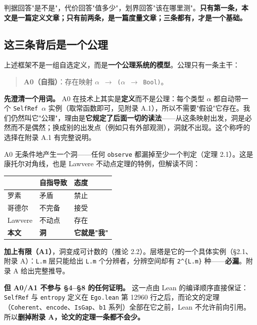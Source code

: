 \documentclass[11pt,a4paper]{ctexart}
\begin{document}
判据回答"是不是"，代价回答"值多少"，划界回答"该在哪里测"。\textbf{只有第一条，本文是一篇定义文章；只有前两条，是一篇度量文章；三条都有，才是一个基础。}

\subsection{这三条背后是一个公理}

上述框架不是一组自选定义，而是\textbf{一个公理系统的模型}。公理只有一条主干：

\begin{quote}
\textbf{A0（自指）}：存在映射 \texttt{\ensuremath{\alpha} \ensuremath{\to} (\ensuremath{\alpha} \ensuremath{\to} Bool)}。
\end{quote}

\textbf{先澄清一个用词。} A0 在技术上其实是\textbf{定义}而不是公理：每个类型 \texttt{\ensuremath{\alpha}} 都自动带一个 \texttt{SelfRef \ensuremath{\alpha}} 实例（取常函数即可，见附录 A.1），所以不需要"假设"它存在。我们仍然叫它"公理"，理由是\textbf{它规定了后面一切的读法}——从这条映射出发，洞是必然而不是偶然；换成别的出发点（例如只有外部观测），洞就不出现。这个称呼的选择在附录 A.1 有完整说明。

A0 无条件地产生一个洞——任何 \texttt{observe} 都漏掉至少一个判定（定理 2.1）。这是康托尔对角线，也是 Lawvere 不动点定理的特例，但解读不同：

\begin{center}\small
\begin{tabular}{lll}
\toprule
 & 自指导致 & 态度 \\
\midrule
罗素 & 矛盾 & 禁止 \\
哥德尔 & 不完备 & 接受 \\
Lawvere & 不动点 & 存在 \\
\textbf{本文} & \textbf{洞} & \textbf{它就是"我"} \\
\bottomrule
\end{tabular}
\end{center}

\textbf{加上有限（A1）}，洞变成可计数的（推论 2.2）。层塔是它的一个具体实例（§2.1、附录 A）：\texttt{L.m} 层只能给出 \texttt{L.m} 个分辨者，分辨空间却有 \texttt{2\textasciicircum{}\{L.m\}} 种——\textbf{必漏}。附录 A 给出完整推导。

\textbf{但 A0/A1 不参与 §4–§8 的任何证明。} 这一点由 Lean 的编译顺序直接保证：\texttt{SelfRef} 与 \texttt{entropy} 定义在 \texttt{Ego.lean} 第 12960 行之后，而论文的定理（\texttt{Coherent}、\texttt{encode}、\texttt{IsGap}、\texttt{b1} 系列）全部在它之前，Lean 不允许前向引用。所以\textbf{删掉附录 A，论文的定理一条都不会少。}
\end{document}
